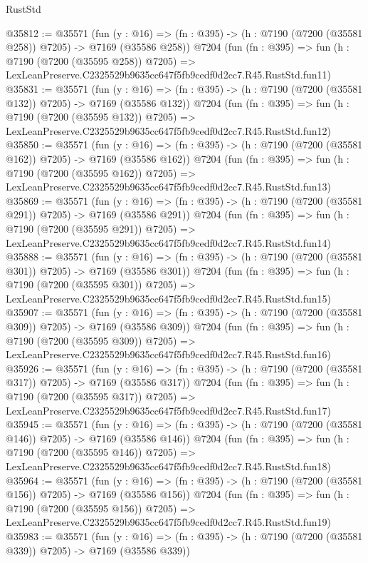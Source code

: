 \begin{lexlean}{RustStd}
\begin{coremodule}
@35812 := @35571
    (fun (y : @16) => (fn : @395) -> (h : @7190 (@7200 (@35581 @258)) @7205) -> @7169 (@35586 @258))
    @7204
    (fun (fn : @395) =>
    fun (h : @7190 (@7200 (@35595 @258)) @7205) =>
    LexLeanPreserve.C2325529b9635cc647f5fb9cedf0d2cc7.R45.RustStd.fun11)
@35831 := @35571
    (fun (y : @16) => (fn : @395) -> (h : @7190 (@7200 (@35581 @132)) @7205) -> @7169 (@35586 @132))
    @7204
    (fun (fn : @395) =>
    fun (h : @7190 (@7200 (@35595 @132)) @7205) =>
    LexLeanPreserve.C2325529b9635cc647f5fb9cedf0d2cc7.R45.RustStd.fun12)
@35850 := @35571
    (fun (y : @16) => (fn : @395) -> (h : @7190 (@7200 (@35581 @162)) @7205) -> @7169 (@35586 @162))
    @7204
    (fun (fn : @395) =>
    fun (h : @7190 (@7200 (@35595 @162)) @7205) =>
    LexLeanPreserve.C2325529b9635cc647f5fb9cedf0d2cc7.R45.RustStd.fun13)
@35869 := @35571
    (fun (y : @16) => (fn : @395) -> (h : @7190 (@7200 (@35581 @291)) @7205) -> @7169 (@35586 @291))
    @7204
    (fun (fn : @395) =>
    fun (h : @7190 (@7200 (@35595 @291)) @7205) =>
    LexLeanPreserve.C2325529b9635cc647f5fb9cedf0d2cc7.R45.RustStd.fun14)
@35888 := @35571
    (fun (y : @16) => (fn : @395) -> (h : @7190 (@7200 (@35581 @301)) @7205) -> @7169 (@35586 @301))
    @7204
    (fun (fn : @395) =>
    fun (h : @7190 (@7200 (@35595 @301)) @7205) =>
    LexLeanPreserve.C2325529b9635cc647f5fb9cedf0d2cc7.R45.RustStd.fun15)
@35907 := @35571
    (fun (y : @16) => (fn : @395) -> (h : @7190 (@7200 (@35581 @309)) @7205) -> @7169 (@35586 @309))
    @7204
    (fun (fn : @395) =>
    fun (h : @7190 (@7200 (@35595 @309)) @7205) =>
    LexLeanPreserve.C2325529b9635cc647f5fb9cedf0d2cc7.R45.RustStd.fun16)
@35926 := @35571
    (fun (y : @16) => (fn : @395) -> (h : @7190 (@7200 (@35581 @317)) @7205) -> @7169 (@35586 @317))
    @7204
    (fun (fn : @395) =>
    fun (h : @7190 (@7200 (@35595 @317)) @7205) =>
    LexLeanPreserve.C2325529b9635cc647f5fb9cedf0d2cc7.R45.RustStd.fun17)
@35945 := @35571
    (fun (y : @16) => (fn : @395) -> (h : @7190 (@7200 (@35581 @146)) @7205) -> @7169 (@35586 @146))
    @7204
    (fun (fn : @395) =>
    fun (h : @7190 (@7200 (@35595 @146)) @7205) =>
    LexLeanPreserve.C2325529b9635cc647f5fb9cedf0d2cc7.R45.RustStd.fun18)
@35964 := @35571
    (fun (y : @16) => (fn : @395) -> (h : @7190 (@7200 (@35581 @156)) @7205) -> @7169 (@35586 @156))
    @7204
    (fun (fn : @395) =>
    fun (h : @7190 (@7200 (@35595 @156)) @7205) =>
    LexLeanPreserve.C2325529b9635cc647f5fb9cedf0d2cc7.R45.RustStd.fun19)
@35983 := @35571
    (fun (y : @16) => (fn : @395) -> (h : @7190 (@7200 (@35581 @339)) @7205) -> @7169 (@35586 @339))

\end{coremodule}
\end{lexlean}
